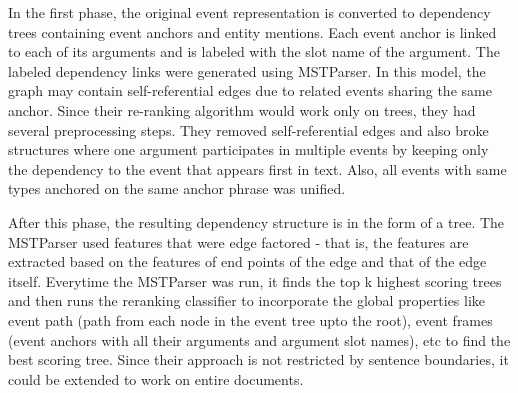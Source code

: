 In the first phase, the original event representation is converted to dependency trees containing event anchors and entity mentions. Each event anchor is linked to each of its arguments and is labeled with the slot name of the argument. The labeled dependency links were generated using MSTParser. In this model, the graph may contain self-referential edges due to related events sharing the same anchor. Since their re-ranking algorithm would work only on trees, they had several preprocessing steps. They removed self-referential edges and also broke structures where one argument participates in multiple events by keeping only the dependency to the event that appears first in text. Also, all events with same types anchored on the same anchor phrase was unified. 

After this phase, the resulting dependency structure is in the form of a tree. The MSTParser used features that were edge factored - that is, the features are extracted based on the features of end points of the edge and that of the edge itself. Everytime the MSTParser was run, it finds the top k  highest scoring trees and then runs the reranking classifier to incorporate the global properties like event path (path from each node in the event tree upto the root), event frames (event anchors with all their arguments and argument slot names), etc to find the best scoring tree. Since their approach is not restricted by sentence boundaries, it could be extended to work on entire documents. \\